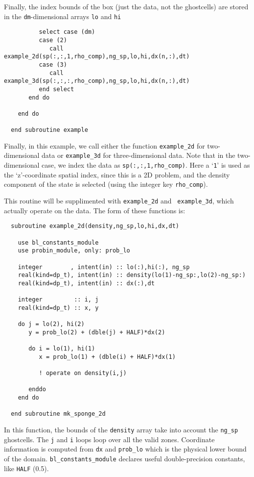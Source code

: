 Finally, the index bounds of the box (just the data, not the ghostcells) are 
stored in the {\tt dm}-dimensional arrays {\tt lo} and {\tt hi}

\begin{verbatim}
          select case (dm)
          case (2)
             call example_2d(sp(:,:,1,rho_comp),ng_sp,lo,hi,dx(n,:),dt)
          case (3)
             call example_3d(sp(:,:,:,rho_comp),ng_sp,lo,hi,dx(n,:),dt)
          end select
       end do

    end do

  end subroutine example
\end{verbatim}

\noindent Finally, in this example, we call either the function
{\tt example\_2d} for two-dimensional data or {\tt example\_3d}
for three-dimensional data.  Note that in the two-dimensional
case, we index the data as {\tt sp(:,:,1,rho\_comp)}.  Here a
`{\tt 1}' is used as the `z'-coordinate spatial index, since this
is a 2D problem, and the density component of the state is selected
(using the integer key {\tt rho\_comp}).

This routine will be supplimented with {\tt example\_2d} and {\tt
example\_3d}, which actually operate on the data.  The form of 
these functions is:

\begin{verbatim}
  subroutine example_2d(density,ng_sp,lo,hi,dx,dt)

    use bl_constants_module
    use probin_module, only: prob_lo

    integer        , intent(in) :: lo(:),hi(:), ng_sp
    real(kind=dp_t), intent(in) :: density(lo(1)-ng_sp:,lo(2)-ng_sp:)
    real(kind=dp_t), intent(in) :: dx(:),dt

    integer         :: i, j
    real(kind=dp_t) :: x, y

    do j = lo(2), hi(2)
       y = prob_lo(2) + (dble(j) + HALF)*dx(2)

       do i = lo(1), hi(1)
          x = prob_lo(1) + (dble(i) + HALF)*dx(1)

          ! operate on density(i,j)

       enddo
    end do

  end subroutine mk_sponge_2d
\end{verbatim}

\noindent In this function, the bounds of the {\tt density} array
take into account the {\tt ng\_sp} ghostcells.  The {\tt j} and {\tt i}
loops loop over all the valid zones.  Coordinate information is 
computed from {\tt dx} and {\tt prob\_lo} which is the physical
lower bound of the domain.  {\tt bl\_constants\_module} declares
useful double-precision constants, like {\tt HALF} (0.5).

